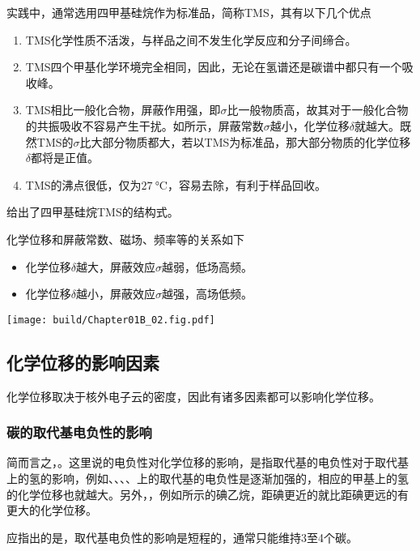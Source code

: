 实践中，通常选用四甲基硅烷作为标准品，简称TMS，其有以下几个优点
\begin{enumerate}
    \item TMS化学性质不活泼，与样品之间不发生化学反应和分子间缔合。
    \item TMS四个甲基化学环境完全相同，因此，无论在氢谱还是碳谱中都只有一个吸收峰。
    \item TMS相比一般化合物，屏蔽作用强，即$\sigma$比一般物质高，故其对于一般化合物的共振吸收不容易产生干扰。如所示，屏蔽常数$\sigma$越小，化学位移$\delta$就越大。既然TMS的$\sigma$比大部分物质都大，若以TMS为标准品，那大部分物质的化学位移$\delta$都将是正值。
    \item TMS的沸点很低，仅为$\SI{27}{\degreeCelsius}$，容易去除，有利于样品回收。
\end{enumerate}\goodbreak

给出了四甲基硅烷TMS的结构式。
\begin{Figure}[四甲基硅烷]
\end{Figure}
化学位移和屏蔽常数、磁场、频率等的关系如下
\begin{itemize}
    \item 化学位移$\delta$越大，屏蔽效应$\sigma$越弱，低场高频。
    \item 化学位移$\delta$越小，屏蔽效应$\sigma$越强，高场低频。
\end{itemize}
\begin{Figure}[化学位移的图像]
    \texttt{[image: build/Chapter01B\_02.fig.pdf]}
\end{Figure}

\subsection{化学位移的影响因素}
化学位移取决于核外电子云的密度，因此有诸多因素都可以影响化学位移。

\subsubsection{碳的取代基电负性的影响}
简而言之，。这里说的电负性对化学位移的影响，是指取代基的电负性对于取代基上的氢的影响，例如、、、、上的取代基的电负性是逐渐加强的，相应的甲基上的氢的化学位移也就越大。另外，，例如所示的碘乙烷，距碘更近的就比距碘更远的有更大的化学位移。
\begin{Figure}[化学位移与电负性的关系]
\end{Figure}
应指出的是，取代基电负性的影响是短程的，通常只能维持3至4个碳。


